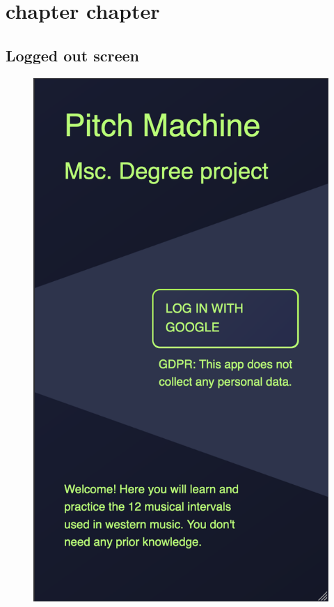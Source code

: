 \chapter{chapter chapter}
\label{appA}


\section{Logged out screen}
\begin{figure}[H]
\centering
\includegraphics[scale=.33]{Parts/Fig/loggedout.png}
\vspace*{-5mm}
\end{figure}

